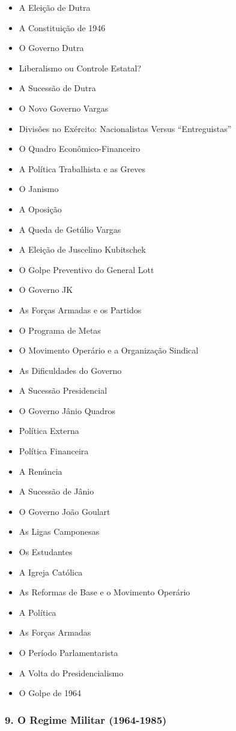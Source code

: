 \documentclass[a4paper,12pt]{article}[abntex2]
\begin{document}
\begin{itemize}
\item A Eleição de Dutra
\item A Constituição de 1946
\item O Governo Dutra
\item Liberalismo ou Controle Estatal?
\item A Sucessão de Dutra
\item O Novo Governo Vargas
\item Divisões no Exército: Nacionalistas Versus “Entreguistas”
\item O Quadro Econômico-Financeiro
\item A Política Trabalhista e as Greves
\item O Janismo
\item A Oposição
\item A Queda de Getúlio Vargas
\item A Eleição de Juscelino Kubitschek
\item O Golpe Preventivo do General Lott
\item O Governo JK
\item As Forças Armadas e os Partidos
\item O Programa de Metas
\item O Movimento Operário e a Organização Sindical
\item As Dificuldades do Governo
\item A Sucessão Presidencial
\item O Governo Jânio Quadros
\item Política Externa
\item Política Financeira
\item A Renúncia
\item A Sucessão de Jânio
\item O Governo João Goulart
\item As Ligas Camponesas
\item Os Estudantes
\item A Igreja Católica
\item As Reformas de Base e o Movimento Operário
\item A Política
\item As Forças Armadas
\item O Período Parlamentarista
\item A Volta do Presidencialismo
\item O Golpe de 1964
\end{itemize}\subsubsection*{9. O Regime Militar (1964-1985)}
\end{document}
